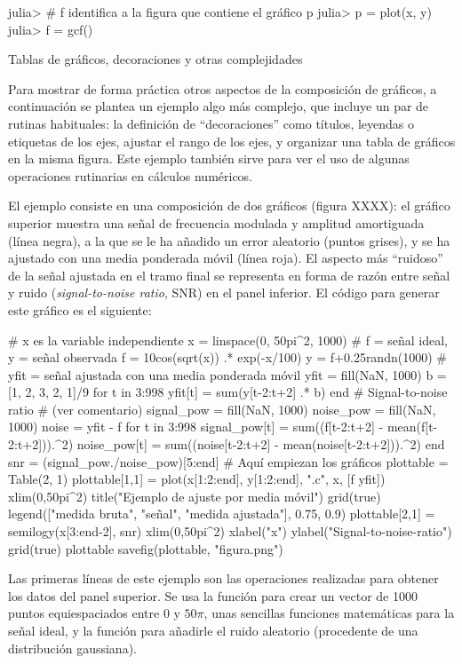﻿\documentclass[spanish]{article}
\begin{document}
julia> # f identifica a la figura que contiene el gráfico p
julia> p = plot(x, y)
julia> f = gcf()


Tablas de gráficos, decoraciones y otras complejidades

Para mostrar de forma práctica otros aspectos de la composición de gráficos,
a continuación se plantea un ejemplo algo más complejo, que incluye un par de
rutinas habituales: la definición de ``decoraciones''
como títulos, leyendas o etiquetas de los ejes, ajustar el rango de los ejes, y
organizar una tabla de gráficos en la misma figura. Este ejemplo también
sirve para ver el uso de algunas operaciones rutinarias en cálculos numéricos.

El ejemplo consiste en una composición de dos gráficos (figura XXXX):
el gráfico superior muestra una señal de
frecuencia modulada y amplitud amortiguada (línea negra), a la que se le ha
añadido un error aleatorio (puntos grises), y se ha ajustado con una media
ponderada móvil (línea roja). El aspecto más ``ruidoso'' de la señal ajustada en el
tramo final se representa en forma de razón entre señal y ruido
(\emph{signal-to-noise ratio}, SNR) en el panel inferior. El código para
generar este gráfico es el siguiente:

# x es la variable independiente
x = linspace(0, 50pi^2, 1000)
# f = señal ideal, y = señal observada
f = 10cos(sqrt(x)) .* exp(-x/100)
y = f+0.25randn(1000)
# yfit = señal ajustada con una media ponderada móvil
yfit = fill(NaN, 1000)
b = [1, 2, 3, 2, 1]/9
for t in 3:998
  yfit[t] = sum(y[t-2:t+2] .* b)
end
# Signal-to-noise ratio
# (ver comentario)
signal_pow = fill(NaN, 1000)
noise_pow = fill(NaN, 1000)
noise = yfit - f
for t in 3:998
  signal_pow[t] = sum((f[t-2:t+2] - mean(f[t-2:t+2])).^2)
  noise_pow[t] = sum((noise[t-2:t+2] - mean(noise[t-2:t+2])).^2)
end
snr = (signal_pow./noise_pow)[5:end]
# Aquí empiezan los gráficos
plottable = Table(2, 1)
plottable[1,1] = plot(x[1:2:end], y[1:2:end], ".c", x, [f yfit])
xlim(0,50pi^2)
title("Ejemplo de ajuste por media móvil")
grid(true)
legend(["medida bruta", "señal", "medida ajustada"], 0.75, 0.9)
plottable[2,1] = semilogy(x[3:end-2], snr)
xlim(0,50pi^2)
xlabel("x")
ylabel("Signal-to-noise-ratio")
grid(true)
plottable
savefig(plottable, "figura.png")

Las primeras líneas de este ejemplo son las operaciones realizadas
para obtener los datos del panel superior. Se usa la función 
para crear un vector de 1000 puntos equiespaciados entre $0$ y $50\pi$,
unas sencillas funciones matemáticas para la señal ideal, y la función
 para añadirle el ruido aleatorio (procedente de una distribución
gaussiana).
\end{document}
